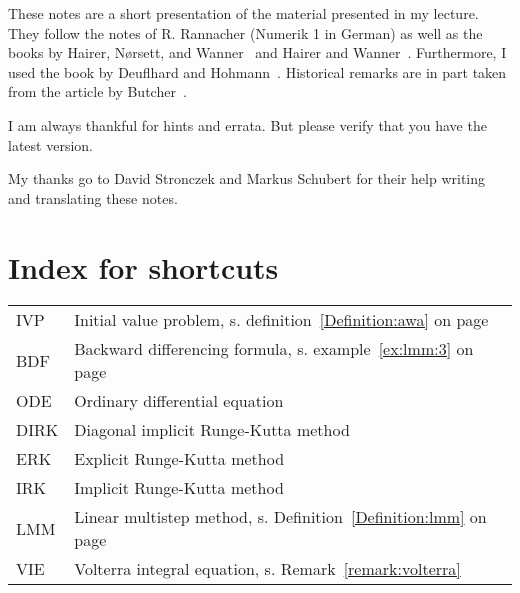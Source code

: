 

These notes are a short presentation of the material presented in my
lecture. They follow the notes of R. Rannacher (Numerik 1 in German)
as well as the books by Hairer, Nørsett, and
Wanner~\cite{HairerNorsettWanner93} and Hairer and
Wanner~\cite{HairerWanner10}. Furthermore, I used the book by
Deuflhard and Hohmann~\cite{DeuflhardBornemann08}. Historical remarks
are in part taken from the article by Butcher~\cite{Butcher96}.

I am always thankful for hints and errata. But please verify that you
have the latest version.

My thanks go to David Stronczek and Markus Schubert for their help
writing and translating these notes.

\clearpage
\section*{Index for shortcuts}
\begin{tabular}{ll}
  IVP & Initial value problem, s. definition~\ref{Definition:awa} on page~\pageref{Definition:awa}\\
  BDF & Backward differencing formula, s. example~\ref{ex:lmm:3} on page~\pageref{ex:lmm:3}\\
  ODE & Ordinary differential equation\\
  DIRK & Diagonal implicit Runge-Kutta method\\
  ERK & Explicit Runge-Kutta method\\
  IRK & Implicit Runge-Kutta method\\
  LMM & Linear multistep method, s. Definition~\ref{Definition:lmm} on
  page~\pageref{ex:lmm:1}\\
  VIE & Volterra integral equation, s. Remark~\vref{remark:volterra}
\end{tabular}

